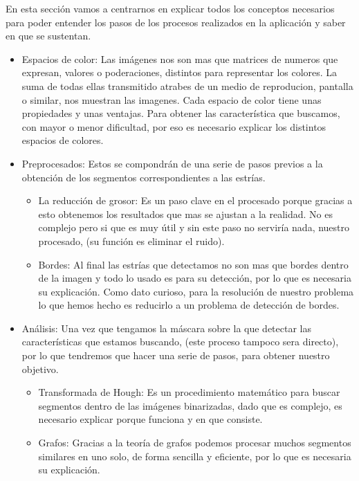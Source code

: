 En esta sección vamos a centrarnos en explicar todos los conceptos necesarios para poder entender los pasos de los procesos realizados en la aplicación y saber en que se sustentan.

\begin{itemize}
\item Espacios de color: Las imágenes nos son mas que matrices de numeros que expresan, valores o poderaciones, distintos para representar los colores. La suma de todas ellas transmitido atrabes de un medio de reproducion, pantalla o similar, nos muestran las imagenes.
Cada espacio de color tiene unas propiedades y unas ventajas. Para obtener las característica que buscamos, con mayor o menor dificultad, por eso es necesario explicar los distintos espacios de colores.

\item Preprocesados:
Estos se compondrán de una serie de pasos previos a la obtención de los segmentos correspondientes a las estrías.
	\begin{itemize}
		\item La reducción de grosor: Es un paso clave en el procesado porque gracias a esto obtenemos los resultados que mas se ajustan a la realidad.
No es complejo pero si que es muy útil y sin este paso no serviría nada, nuestro procesado, (su función es eliminar el ruido).
		\item Bordes: Al final las estrías que detectamos no son mas que bordes dentro de la imagen y todo lo usado es para su detección, por lo que es necesaria su explicación. Como dato curioso, para la resolución de nuestro problema lo que hemos hecho es reducirlo a un problema de detección de bordes.
	\end{itemize}

\item Análisis: 
Una vez que tengamos la máscara sobre la que detectar las características que estamos buscando, (este proceso tampoco sera directo), por lo que tendremos que hacer una serie de pasos, para obtener nuestro objetivo.
	\begin{itemize}
	\item Transformada de Hough: Es un procedimiento matemático para buscar segmentos dentro de las imágenes binarizadas, dado que es complejo, es necesario explicar porque funciona y en que consiste.

	\item Grafos: Gracias a la teoría de grafos podemos procesar muchos segmentos similares en uno solo, de forma sencilla y eficiente, por lo que es necesaria su explicación.
	\end{itemize}

\end{itemize}



